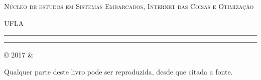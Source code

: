 \documentclass[
	11pt,				%
	openright,			%
	twoside,			%
	a5paper,			%
	english,			%
	french,				%
	spanish,			%
	brazil,				%
	sumario=tradicional
]{abntex2}
\newcommand{\plogo}{\fbox{$\mathcal{UFLA}$}} %
\begin{document}
\begin{titlingpage}
	\hspace{10pt}\textsc{Núcleo de estudos em Sistemas Embarcados, Internet das Coisas e Otimização}
	
	UFLA
	
	
	\vspace{0.1\textheight} %
	
	
	\rule{270pt}{0.4pt} %
	
	\vspace{2pt}\vspace{-\baselineskip} %
	
	\rule{270pt}{1pt} %
	
\end{titlingpage}




\clearpage
\ABNTEXfontereduzida
© 2017 \imprimirautor \space \& \imprimirinstituicao

Qualquer parte deste livro pode ser reproduzida, desde que citada a fonte.
\end{document}
